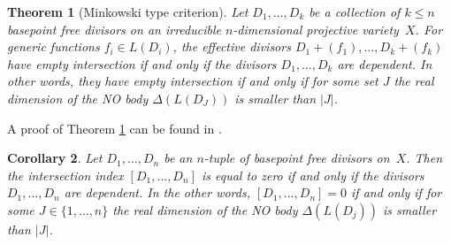 \documentclass[11pt]{article}
\theoremstyle{plain}
\newtheorem{theorem}{Theorem}[section]
\newtheorem{corollary}[theorem]{Corollary}
\theoremstyle{definition}
\begin{document}
\begin{theorem}[Minkowski type criterion]\label{theorem9.1}
 Let $D_1,\dots,D_k$ be a collection of $k\leq n$ basepoint free  divisors on an irreducible $n$-dimensional projective variety~$X$. For generic functions $f_i\in L(D_i)$, the effective divisors $D_1+(f_1),\dots, D_k+(f_k)$ have  empty intersection if and only if the divisors $D_1,\dots,D_k$ are dependent. In other words, they have empty intersection if and only if for some set $J$ the real dimension  of the NO body $\Delta( L(D_J))$ is smaller than $|J|$.
\end{theorem}

A proof of Theorem \ref{theorem9.1} can be found in  \cite{K-K16}.

\begin{corollary} Let $D_1,\dots,D_n$ be an $n$-tuple of basepoint free  divisors on~$X$. Then the intersection index $[D_1,\dots,D_n]$ is equal to zero if and only if the divisors $D_1,\dots,D_n$ are dependent. In the other words, $[D_1,\dots,D_n]=0$ if and only if for some $J\in \{1,\dots,n\}$ the real dimension of the NO body $\Delta(L(D_j))$ is smaller than $|J|$.

\end{corollary}



\end{document}
